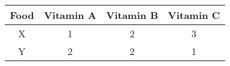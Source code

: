 \begin{tabular}{|c|c|c|c|}
\hline
Food	&Vitamin A	&Vitamin B	&Vitamin C\\ \hline
X	&1	&2	&3\\ \hline
Y	&2	&2	&1\\ \hline
\end{tabular}

